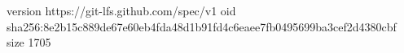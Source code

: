 version https://git-lfs.github.com/spec/v1
oid sha256:8e2b15c889de67e60eb4fda48d1b91fd4c6eaee7fb0495699ba3cef2d4380cbf
size 1705
